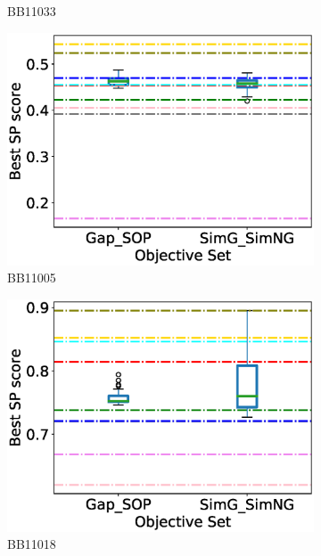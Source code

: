 \begin{figure}[!htbp]
\begin{adjustwidth}{-1cm}{-1cm}
\begin{subfigure}{0.26\textwidth}
			\caption{BB11033}
		\end{subfigure}
		\begin{subfigure}{0.26\textwidth}
			\includegraphics[width=\columnwidth]{Figure/summary/precomputedInit/Balibase/BB11005_objset_pairs_rank_2}
			\caption{BB11005}
		\end{subfigure}    
		\begin{subfigure}{0.26\textwidth}
			\includegraphics[width=\columnwidth]{Figure/summary/precomputedInit/Balibase/BB11018_objset_pairs_rank_2}
			\caption{BB11018}
		\end{subfigure}
		\begin{subfigure}{0.26\textwidth}

\end{subfigure}
\end{adjustwidth}
\end{figure}
